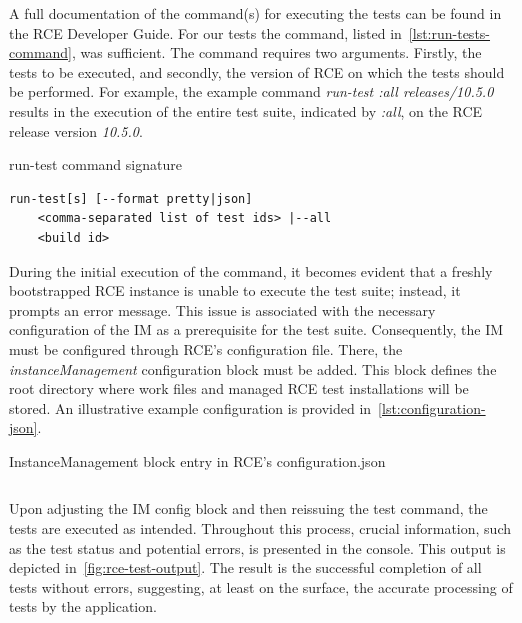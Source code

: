 A full documentation of the command(s) for executing the tests can be found in the \ac{RCE} Developer Guide. For our tests the command, listed in~\cref{lst:run-tests-command}, was sufficient. The command requires two arguments. Firstly, the tests to be executed, and secondly, the version of \ac{RCE} on which the tests should be performed. For example, the example command \textit{run-test :all releases/10.5.0} results in the execution of the entire test suite, indicated by \textit{:all}, on the \ac{RCE} release version \textit{10.5.0}.

\begin{listing}[ht]
\caption{run-test command signature}
\label{lst:run-tests-command}
\begin{verbatim}
run-test[s] [--format pretty|json] 
    <comma-separated list of test ids> |--all
    <build id>
\end{verbatim}
\end{listing}


During the initial execution of the command, it becomes evident that a freshly bootstrapped \ac{RCE} instance is unable to execute the test suite; instead, it prompts an error message. This issue is associated with the necessary configuration of the \ac{IM} as a prerequisite for the test suite. Consequently, the \ac{IM} must be configured through \ac{RCE}'s configuration file. There, the \textit{instanceManagement} configuration block must be added. This block defines the root directory where work files and managed RCE test installations will be stored. An illustrative example configuration is provided in~\cref{lst:configuration-json}.

\begin{listing}
\caption{InstanceManagement block entry in \ac{RCE}'s configuration.json}
\label{lst:configuration-json}
\inputminted{json}{files/code/configuration.json}
\end{listing}

Upon adjusting the \ac{IM} config block and then reissuing the test command, the tests are executed as intended. Throughout this process, crucial information, such as the test status and potential errors, is presented in the console. This output is depicted in~\cref{fig:rce-test-output}. The result is the successful completion of all tests without errors, suggesting, at least on the surface, the accurate processing of tests by the application.

